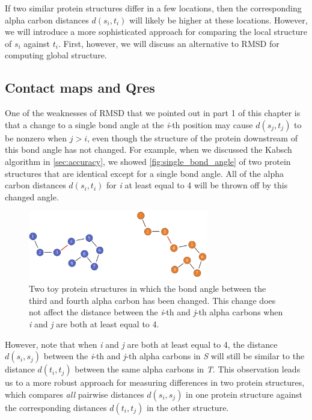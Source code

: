 If two similar protein structures differ in a few locations, then the corresponding alpha carbon distances $d(s_{i}, t_{i})$ will likely be higher at these locations. However, we will introduce a more sophisticated approach for
comparing the local structure of $s_{i}$ against $t_{i}$. First, however, we will discuss an alternative to RMSD for computing global structure.

\FloatBarrier
{}
\subsection{Contact maps and Qres}

One of the weaknesses of RMSD that we pointed out in part 1 of this chapter is that a change to a single bond angle at the \textit{i}-th position may cause $d(s_{j}, t_{j})$ to be nonzero when $j > i$, even though the structure of the protein downstream of this bond angle has not changed. For example, when we discussed the Kabsch algorithm in \autoref{sec:accuracy}, we showed \autoref{fig:single_bond_angle} of two protein structures that are identical except for a single bond angle. All of the alpha carbon distances $d(s_{i}, t_{i})$ for \textit{i} at least equal to 4 will be thrown off by this changed angle.

\begin{figure}[h]
	\centering
	\mySfFamily
	\includegraphics[width = 0.7\textwidth]{../images/single_bond_angle.png}
	\caption{Two toy protein structures in which the bond angle between the third and fourth alpha carbon has been changed. This change does not affect the distance between the \textit{i}-th and \textit{j}-th alpha carbons when \textit{i} and \textit{j} are both at least equal to 4.}
	\label{fig:single_bond_angle}
\end{figure}

However, note that when \textit{i} and \textit{j} are both at least equal to 4, the distance $d(s_{i}, s_{j})$ between the \textit{i}-th and \textit{j}-th alpha carbons in \textit{S} will still be similar to the distance $d(t_{i}, t_{j})$ between the same alpha carbons in \textit{T}. This observation leads us to a more robust approach for measuring differences in two protein structures, which compares \textit{all} pairwise distances $d(s_{i}, s_{j})$ in one protein structure against the corresponding distances $d(t_{i}, t_{j})$ in the other structure.

